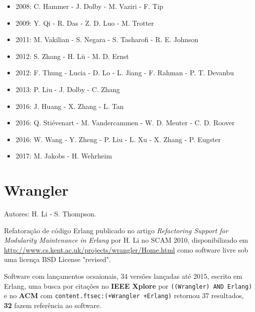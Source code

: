 \begin{itemize}
\item 2008: C. Hammer - J. Dolby - M. Vaziri - F. Tip
\item 2009: Y. Qi - R. Das - Z. D. Luo - M. Trotter
\item 2011: M. Vakilian - S. Negara - S. Tasharofi - R. E. Johnson
\item 2012: S. Zhang - H. L\"{u} - M. D. Ernst
\item 2012: F. Thung - Lucia - D. Lo - L. Jiang - F. Rahman - P. T. Devanbu
\item 2013: P. Liu - J. Dolby - C. Zhang
\item 2016: J. Huang - X. Zhang - L. Tan
\item 2016: Q. Stiévenart - M. Vandercammen - W. D. Meuter - C. D. Roover
\item 2016: W. Wang - Y. Zheng - P. Liu - L. Xu - X. Zhang - P. Eugster
\item 2017: M. Jakobs - H. Wehrheim
\end{itemize}

\section{Wrangler}

Autores:
H. Li - S. Thompson.

Refatoração de código Erlang
publicado no artigo {\it Refactoring Support for Modularity Maintenance in Erlang}
por H. Li
no SCAM 2010,
disponibilizado em \url{http://www.cs.kent.ac.uk/projects/wrangler/Home.html}
como software livre
sob uma licença BSD License "revised".

Software com lançamentos ocsaionais,
34 versões lançadas
até 2015,
escrito em Erlang,
uma busca por citações no {\bf IEEE Xplore} por
\texttt{((Wrangler) AND Erlang)}
e no {\bf ACM} com
\texttt{content.ftsec:(+Wrangler +Erlang)}
retornou
37 resultados,
{\bf 32} fazem referência ao software.

